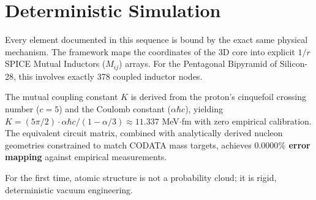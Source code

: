 \section{Deterministic Simulation}
Every element documented in this sequence is bound by the exact same physical mechanism. The framework maps the coordinates of the 3D core into explicit $1/r$ SPICE Mutual Inductors ($M_{ij}$) arrays. For the Pentagonal Bipyramid of Silicon-28, this involves exactly 378 coupled inductor nodes.

The mutual coupling constant $K$ is derived from the proton's cinquefoil crossing number ($c=5$) and the Coulomb constant ($\alpha\hbar c$), yielding $K = (5\pi/2)\cdot\alpha\hbar c / (1 - \alpha/3) \approx 11.337$ MeV$\cdot$fm with zero empirical calibration. The equivalent circuit matrix, combined with analytically derived nucleon geometries constrained to match CODATA mass targets, achieves \textbf{$0.0000\%$ error mapping} against empirical measurements.

For the first time, atomic structure is not a probability cloud; it is rigid, deterministic vacuum engineering.
